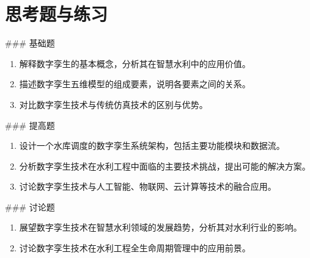 \section{思考题与练习}

\#\#\# 基础题

\begin{enumerate}
\def\labelenumi{\arabic{enumi}.}
\tightlist
\item
  解释数字孪生的基本概念，分析其在智慧水利中的应用价值。
\item
  描述数字孪生五维模型的组成要素，说明各要素之间的关系。
\item
  对比数字孪生技术与传统仿真技术的区别与优势。
\end{enumerate}

\#\#\# 提高题

\begin{enumerate}
\def\labelenumi{\arabic{enumi}.}
\setcounter{enumi}{3}
\tightlist
\item
  设计一个水库调度的数字孪生系统架构，包括主要功能模块和数据流。
\item
  分析数字孪生技术在水利工程中面临的主要技术挑战，提出可能的解决方案。
\item
  讨论数字孪生技术与人工智能、物联网、云计算等技术的融合应用。
\end{enumerate}

\#\#\# 讨论题

\begin{enumerate}
\def\labelenumi{\arabic{enumi}.}
\setcounter{enumi}{6}
\tightlist
\item
  展望数字孪生技术在智慧水利领域的发展趋势，分析其对水利行业的影响。
\item
  讨论数字孪生技术在水利工程全生命周期管理中的应用前景。
\end{enumerate}
